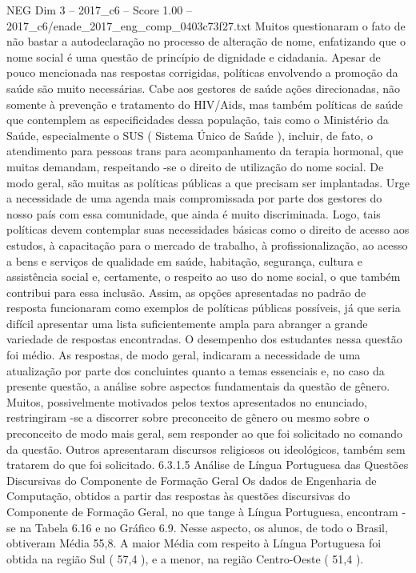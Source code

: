 \begin{textsample}{NEG Dim 3 – 2017\_c6 – Score 1.00 – 2017\_c6/enade\_2017\_eng\_comp\_0403c73f27.txt}
Muitos questionaram o fato de não bastar a autodeclaração no processo de alteração de nome, enfatizando que o nome social é uma questão de princípio de dignidade e cidadania.
Apesar de pouco mencionada nas respostas corrigidas, políticas envolvendo a promoção da saúde são muito necessárias.
Cabe aos gestores de saúde ações direcionadas, não somente à prevenção e tratamento do HIV/Aids, mas também políticas de saúde que contemplem as especificidades dessa população, tais como o Ministério da Saúde, especialmente o SUS ( Sistema Único de Saúde ), incluir, de fato, o atendimento para pessoas trans para acompanhamento da terapia hormonal, que muitas demandam, respeitando -se o direito de utilização do nome social.
De modo geral, são muitas as políticas públicas a que precisam ser implantadas.
Urge a necessidade de uma agenda mais compromissada por parte dos gestores do nosso país com essa comunidade, que ainda é muito discriminada.
Logo, tais políticas devem contemplar suas necessidades básicas como o direito de acesso aos estudos, à capacitação para o mercado de trabalho, à profissionalização, ao acesso a bens e serviços de qualidade em saúde, habitação, segurança, cultura e assistência social e, certamente, o respeito ao uso do nome social, o que também contribui para essa inclusão.
Assim, as opções apresentadas no padrão de resposta funcionaram como exemplos de políticas públicas possíveis, já que seria difícil apresentar uma lista suficientemente ampla para abranger a grande variedade de respostas encontradas.
O desempenho dos estudantes nessa questão foi médio.
As respostas, de modo geral, indicaram a necessidade de uma atualização por parte dos concluintes quanto a temas essenciais e, no caso da presente questão, a análise sobre aspectos fundamentais da questão de gênero.
Muitos, possivelmente motivados pelos textos apresentados no enunciado, restringiram -se a discorrer sobre preconceito de gênero ou mesmo sobre o preconceito de modo mais geral, sem responder ao que foi solicitado no comando da questão.
Outros apresentaram discursos religiosos ou ideológicos, também sem tratarem do que foi solicitado. 6.3.1.5 Análise de Língua Portuguesa das Questões Discursivas do Componente de Formação Geral Os dados de Engenharia de Computação, obtidos a partir das respostas às questões discursivas do Componente de Formação Geral, no que tange à Língua Portuguesa, encontram -se na Tabela 6.16 e no Gráfico 6.9.
Nesse aspecto, os alunos, de todo o Brasil, obtiveram Média 55,8.
A maior Média com respeito à Língua Portuguesa foi obtida na região Sul ( 57,4 ), e a menor, na região Centro-Oeste ( 51,4 ).

\end{textsample}
